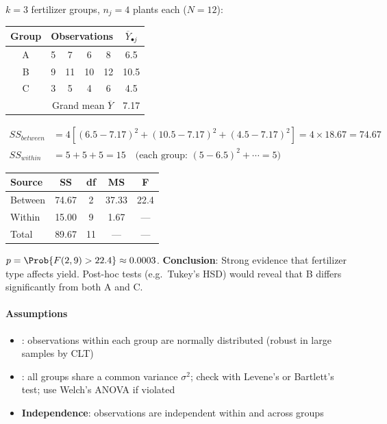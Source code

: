 $k=3$ fertilizer groups, $n_j=4$ plants each ($N=12$):

\begin{center}
\begin{tabular}{|c|cccc|c|}
    \hline
    \textbf{Group} & \multicolumn{4}{c|}{\textbf{Observations}} & $\overline{Y}_{\bullet j}$ \\
    \hline
    A & 5 & 7 & 6 & 8  & 6.5  \\
    B & 9 & 11 & 10 & 12 & 10.5 \\
    C & 3 & 5  & 4  & 6  & 4.5  \\
    \hline
    \multicolumn{5}{|r|}{Grand mean $\overline{Y}$} & 7.17 \\
    \hline
\end{tabular}
\end{center}

\begin{align*}
    SS_{between} &= 4\left[(6.5-7.17)^2+(10.5-7.17)^2+(4.5-7.17)^2\right]
                  = 4 \times 18.67 = 74.67 \\
    SS_{within}  &= 5 + 5 + 5 = 15
    \quad \text{(each group: }(5-6.5)^2+\cdots = 5\text{)}
\end{align*}

\begin{center}
\begin{tabular}{|l|c|c|c|c|}
    \hline
    \textbf{Source} & \textbf{SS} & \textbf{df} & \textbf{MS} & \textbf{F} \\
    \hline
    Between & 74.67 & 2 & 37.33 & 22.4 \\
    Within  & 15.00 & 9 & 1.67  & ---  \\
    Total   & 89.67 & 11 & ---  & ---  \\
    \hline
\end{tabular}
\end{center}

$p = \Prob{F(2,9) > 22.4} \approx 0.0003$. \textbf{Conclusion}: Strong evidence that
fertilizer type affects yield. Post-hoc tests (e.g.\ Tukey's HSD) would reveal that B
differs significantly from both A and C.

\paragraph{Assumptions}
\begin{itemize}
    \item {}: observations within each group are normally distributed (robust
        in large samples by CLT)
    \item {}: all groups share a common variance $\sigma^2$; check
        with Levene's or Bartlett's test; use Welch's ANOVA if violated
    \item \textbf{Independence}: observations are independent within and across groups
\end{itemize}

